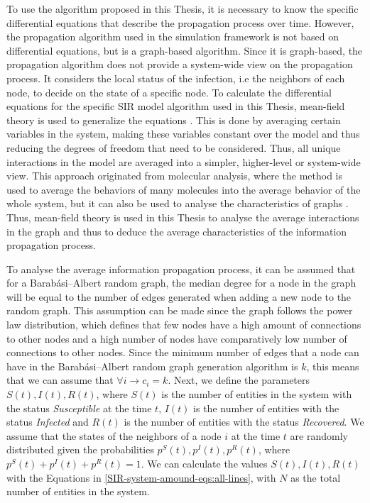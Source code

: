 To use the algorithm proposed in this Thesis, it is necessary to 
know the specific differential equations that describe the propagation 
process over time. However, the propagation algorithm
used in the simulation framework is not based on differential equations,
but is a graph-based algorithm. Since it is graph-based, the propagation algorithm
does not provide a system-wide view on the propagation process.
It considers the local status of the infection, i.e the neighbors
of each node, to decide on the state of a specific node.
To calculate the differential equations for the specific SIR model algorithm
used in this Thesis, mean-field theory is used to generalize the equations
\cite{chaikin1995principles}.
This is done by averaging certain variables in the system, making these
variables constant over the model and thus 
reducing the degrees of freedom that need to be considered.
Thus, all unique interactions in the model are averaged into a simpler,
higher-level or system-wide view.
This approach originated from molecular analysis, where the method is used
to average the behaviors of many molecules into the average behavior
of the whole system,
but it can also be used to analyse the characteristics of graphs
\cite{barabasi1999mean}\cite{sirsmodel}.
Thus, mean-field theory is used in this Thesis to 
analyse the average interactions in the graph and thus to deduce 
the average characteristics of the information 
propagation process. 

To analyse the average information propagation process, 
it can be assumed that for a Barabási–Albert random graph, 
the median degree for a node in the graph will be equal to the number 
of edges generated when adding a new node to the random graph.
This assumption can be made since the graph follows the power law distribution,
which defines that few nodes have a high amount of connections to other nodes
and a high number of nodes have comparatively low number of connections to 
other nodes. Since the minimum number of edges that a node can have 
in the Barabási–Albert random graph generation algorithm is $k$, this 
means that we can assume that $\forall i \to c_i=k$.
Next, we define the parameters $S(t), I(t), R(t)$, where $S(t)$ is the number of
entities in the system with the status \textit{Susceptible} at the time $t$, 
$I(t)$ is the number of entities with the status \textit{Infected} and
$R(t)$ is the number of entities with the status \textit{Recovered}. 
We assume that the states of the neighbors of a node $i$ at the time $t$ are 
randomly distributed given the probabilities $p^S(t), p^I(t), p^R(t)$,
where $p^S(t) + p^I(t) + p^R(t) = 1$. We can calculate the values $S(t), I(t), R(t)$
with the Equations in \ref{SIR-system-amound-eqs:all-lines},
with $N$ as the total number of entities in the system.

